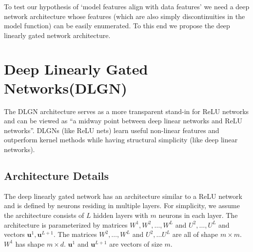 \documentclass{article} %
\renewcommand{\>}{{\rightarrow}}
\renewcommand{\=}{\stackrel{\triangle}{=}}
\newcommand{\0}{{\mathbf 0}}
\newcommand{\cR}{{\mathcal R}}
\newcommand{\bu}{{\mathbf u}}
\begin{document}



To test our hypothesis of `model features align with data features' we need a deep network architecture whose features (which are also simply discontinuities in the model function) can be easily enumerated. To this end we propose the deep linearly gated network architecture.

\section{Deep Linearly Gated Networks(DLGN)}\label{sec:dlgn}

The DLGN architecture serves as a more transparent stand-in for ReLU networks and can be viewed as ``a midway point between deep linear networks and ReLU networks''. DLGNs (like ReLU nets) learn useful non-linear features and outperform kernel methods while having structural simplicity (like deep linear networks).


\subsection{Architecture Details}\label{sec:dlgnarch}
The deep linearly gated network has an architecture similar to a ReLU network and is defined by neurons residing in multiple layers.  For simplicity, we assume the architecture consists of $L$ hidden layers with $m$ neurons in each layer. The architecture is parameterized by matrices $W^1, W^2, \ldots, W^L$ and $U^2, \ldots, U^{L}$ and vectors $\bu^1, \bu^{L+1}$. The matrices $W^2, \ldots, W^L$ and $U^2, \ldots U^L$ are all of shape $m \times m$. $W^1$ has shape $m \times d$. $\bu^1$ and $\bu^{L+1}$ are vectors of size  $m$.
\end{document}
